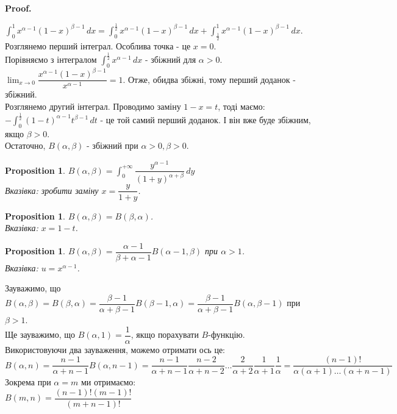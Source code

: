 \documentclass[a4paper, 10pt]{article}
\makeatletter
\def\huge{\displaystyle}
\def\qed{$\blacksquare$}
\theoremstyle{theoremdd}
\theoremstyle{theoremdd}
\theoremstyle{theoremdd}
\theoremstyle{theoremdd}
\theoremstyle{theoremdd}
\theoremstyle{theoremdd}
\newtheorem{proposition}[theorem]{Proposition}
\theoremstyle{theoremdd}
\theoremstyle{theoremdd}
\theoremstyle{theoremdd}
\renewenvironment{proof}[1][Proof.\\]{\par
\pushQED{\hfill \qed}%
\normalfont \topsep6\p@\@plus6\p@\relax
\trivlist
\item\relax
{\bfseries
#1\@addpunct{.}}\hspace\labelsep\ignorespaces
}{%
\popQED\endtrivlist\@endpefalse
}
\makeatother
\begin{document}
\begin{proof}
$\huge \int_0^1 x^{\alpha-1} (1-x)^{\beta-1}\,dx = \int_0^{\frac{1}{2}} x^{\alpha-1} (1-x)^{\beta-1}\,dx +  \int_{\frac{1}{2}}^1 x^{\alpha-1} (1-x)^{\beta-1}\,dx$.\\
Розглянемо перший інтеграл. Особлива точка - це $x =0$.\\
Порівняємо з інтегралом $\huge \int_0^{\frac{1}{2}} x^{\alpha - 1} \,dx$ - збіжний для $\alpha > 0$.\\
$\huge \lim_{x \to 0} \dfrac{x^{\alpha-1}(1-x)^{\beta-1}}{x^{\alpha-1}} = 1$. Отже, обидва збіжні, тому перший доданок - збіжний.\\
Розглянемо другий інтеграл. Проводимо заміну $1-x=t$, тоді маємо:\\
$-\huge \int_{0}^{\frac{1}{2}} (1-t)^{\alpha-1} t^{\beta - 1}\,dt$ - це той самий перший доданок. І він вже буде збіжним, якщо $\beta > 0$.\\
Остаточно, $B(\alpha, \beta)$ - збіжний при $\alpha > 0,\beta > 0$.
\end{proof}

\begin{proposition}
$B(\alpha, \beta) = \huge \int_0^{+\infty} \dfrac{y^{\alpha-1}}{(1+y)^{\alpha+\beta}}\,dy$\\
\textit{Вказівка: зробити заміну} $x = \dfrac{y}{1+y}$.
\end{proposition}

\begin{proposition}
$B(\alpha,\beta) = B(\beta,\alpha)$.\\
\textit{Вказівка: $x = 1-t$}.
\end{proposition}

\begin{proposition}
$B(\alpha,\beta) = \dfrac{\alpha-1}{\beta+\alpha-1} B(\alpha-1,\beta)$ при $\alpha > 1$.\\
\textit{Вказівка: $u = x^{\alpha-1}$}.
\end{proposition}

Зауважимо, що $B(\alpha,\beta) = B(\beta,\alpha) = \dfrac{\beta-1}{\alpha+\beta-1} B(\beta-1,\alpha) = \dfrac{\beta-1}{\alpha+\beta-1} B(\alpha,\beta-1)$ при $\beta > 1$.\\
Ще зауважимо, що $B(\alpha,1) = \dfrac{1}{\alpha}$, якщо порахувати $B$-функцію.\\
Використовуючи два зауваження, можемо отримати ось це:\\
$B(\alpha,n) = \dfrac{n-1}{\alpha+n-1} B(\alpha,n-1) = \dfrac{n-1}{\alpha+n-1} \dfrac{n-2}{\alpha+n-2} \dots \dfrac{2}{\alpha + 2} \dfrac{1}{\alpha + 1} \dfrac{1}{\alpha} = \dfrac{(n-1)!}{\alpha (\alpha+1) \dots (\alpha+n-1)}$\\
Зокрема при $\alpha = m$ ми отримаємо:\\
$B(m,n) = \dfrac{(n-1)!(m-1)!}{(m+n-1)!}$
\end{document}
